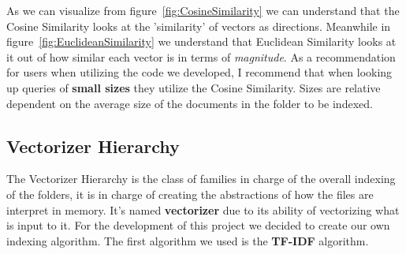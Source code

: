 \documentclass{article}
\begin{document}
As we can visualize from figure~\ref*{fig:CosineSimilarity} we can understand that the Cosine Similarity looks at the 'similarity' of vectors as directions. Meanwhile in figure~\ref*{fig:EuclideanSimilarity} we understand that Euclidean Similarity looks at it out of how similar each vector is in terms of \textit{magnitude}.
\newline
\indent As a recommendation for users when utilizing the code we developed, I recommend that when looking up queries of \textbf{small sizes} they utilize the Cosine Similarity. Sizes are relative dependent on the average size of the documents in the folder to be indexed.

\subsection{Vectorizer Hierarchy}
The Vectorizer Hierarchy is the class of families in charge of the overall indexing of the folders, it is in charge of creating the abstractions of how the files are interpret in memory. It's named \textbf{vectorizer} due to its ability of vectorizing what is input to it. For the development of this project we decided to create our own indexing algorithm. The first algorithm we used is the \textbf{TF-IDF} algorithm.
\end{document}
